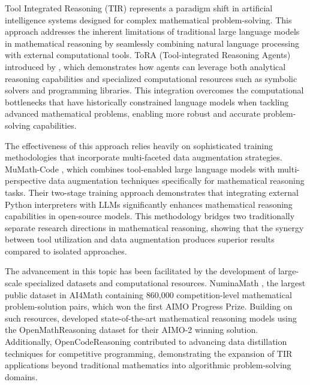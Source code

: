 Tool Integrated Reasoning (TIR) represents a paradigm shift in artificial intelligence systems designed for complex mathematical problem-solving. This approach addresses the inherent limitations of traditional large language models in mathematical reasoning by seamlessly combining natural language processing with external computational tools. ToRA (Tool-integrated Reasoning Agents) introduced by \citep{Gou2024ToRA}, which demonstrates how agents can leverage both analytical reasoning capabilities and specialized computational resources such as symbolic solvers and programming libraries. This integration overcomes the computational bottlenecks that have historically constrained language models when tackling advanced mathematical problems, enabling more robust and accurate problem-solving capabilities.

The effectiveness of this approach relies heavily on sophisticated training methodologies that incorporate multi-faceted data augmentation strategies.  MuMath-Code \citep{Yin2024MuMathCode}, which combines tool-enabled large language models with multi-perspective data augmentation techniques specifically for mathematical reasoning tasks. Their two-stage training approach demonstrates that integrating external Python interpreters with LLMs significantly enhances mathematical reasoning capabilities in open-source models. This methodology bridges two traditionally separate research directions in mathematical reasoning, showing that the synergy between tool utilization and data augmentation produces superior results compared to isolated approaches.

The advancement in this topic has been facilitated by the development of large-scale specialized datasets and computational resources. NuminaMath \citep{Li2024NuminaMath}, the largest public dataset in AI4Math containing 860,000 competition-level mathematical problem-solution pairs, which won the first AIMO Progress Prize. Building on such resources, \citep{Moshkov2025AIMO2} developed state-of-the-art mathematical reasoning models using the OpenMathReasoning dataset for their AIMO-2 winning solution. Additionally,  OpenCodeReasoning \citep{Ahmad2025OCRNVidia} contributed to advancing data distillation techniques for competitive programming, demonstrating the expansion of TIR applications beyond traditional mathematics into algorithmic problem-solving domains.





